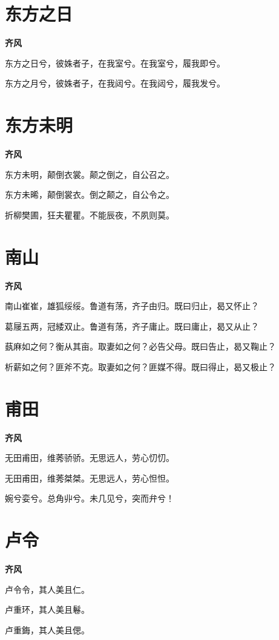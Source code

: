 \documentclass[12pt,a4paper]{ctexbook}
\begin{document}
\section{东方之日}
\textbf{齐风}\par\vspace{0.5em}
东方之日兮，彼姝者子，在我室兮。在我室兮，履我即兮。\par
东方之月兮，彼姝者子，在我闼兮。在我闼兮，履我发兮。\par

\section{东方未明}
\textbf{齐风}\par\vspace{0.5em}
东方未明，颠倒衣裳。颠之倒之，自公召之。\par
东方未晞，颠倒裳衣。倒之颠之，自公令之。\par
折柳樊圃，狂夫瞿瞿。不能辰夜，不夙则莫。\par

\section{南山}
\textbf{齐风}\par\vspace{0.5em}
南山崔崔，雄狐绥绥。鲁道有荡，齐子由归。既曰归止，曷又怀止？\par
葛屦五两，冠緌双止。鲁道有荡，齐子庸止。既曰庸止，曷又从止？\par
蓺麻如之何？衡从其亩。取妻如之何？必告父母。既曰告止，曷又鞠止？\par
析薪如之何？匪斧不克。取妻如之何？匪媒不得。既曰得止，曷又极止？\par

\section{甫田}
\textbf{齐风}\par\vspace{0.5em}
无田甫田，维莠骄骄。无思远人，劳心忉忉。\par
无田甫田，维莠桀桀。无思远人，劳心怛怛。\par
婉兮娈兮。总角丱兮。未几见兮，突而弁兮！\par

\section{卢令}
\textbf{齐风}\par\vspace{0.5em}
卢令令，其人美且仁。\par
卢重环，其人美且鬈。\par
卢重鋂，其人美且偲。\par
\end{document}
